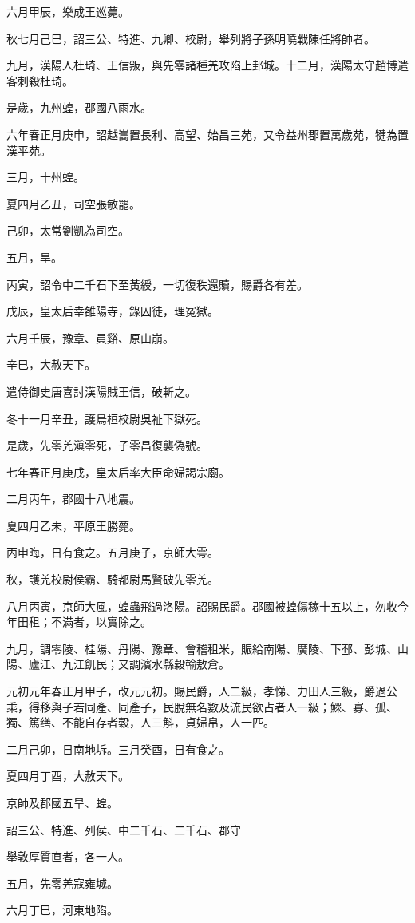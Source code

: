 \begin{pinyinscope}
六月甲辰，樂成王巡薨。

秋七月己巳，詔三公、特進、九卿、校尉，舉列將子孫明曉戰陳任將帥者。

九月，漢陽人杜琦、王信叛，與先零諸種羌攻陷上邽城。十二月，漢陽太守趙博遣客刺殺杜琦。

是歲，九州蝗，郡國八雨水。

六年春正月庚申，詔越巂置長利、高望、始昌三苑，又令益州郡置萬歲苑，犍為置漢平苑。

三月，十州蝗。

夏四月乙丑，司空張敏罷。

己卯，太常劉凱為司空。

五月，旱。

丙寅，詔令中二千石下至黃綬，一切復秩還贖，賜爵各有差。

戊辰，皇太后幸雒陽寺，錄囚徒，理冤獄。

六月壬辰，豫章、員谿、原山崩。

辛巳，大赦天下。

遣侍御史唐喜討漢陽賊王信，破斬之。

冬十一月辛丑，護烏桓校尉吳祉下獄死。

是歲，先零羌滇零死，子零昌復襲偽號。

七年春正月庚戌，皇太后率大臣命婦謁宗廟。

二月丙午，郡國十八地震。

夏四月乙未，平原王勝薨。

丙申晦，日有食之。五月庚子，京師大雩。

秋，護羌校尉侯霸、騎都尉馬賢破先零羌。

八月丙寅，京師大風，蝗蟲飛過洛陽。詔賜民爵。郡國被蝗傷稼十五以上，勿收今年田租；不滿者，以實除之。

九月，調零陵、桂陽、丹陽、豫章、會稽租米，賑給南陽、廣陵、下邳、彭城、山陽、廬江、九江飢民；又調濱水縣穀輸敖倉。

元初元年春正月甲子，改元元初。賜民爵，人二級，孝悌、力田人三級，爵過公乘，得移與子若同產、同產子，民脫無名數及流民欲占者人一級；鰥、寡、孤、獨、篤缮、不能自存者穀，人三斛，貞婦帛，人一匹。

二月己卯，日南地坼。三月癸酉，日有食之。

夏四月丁酉，大赦天下。

京師及郡國五旱、蝗。

詔三公、特進、列侯、中二千石、二千石、郡守

舉敦厚質直者，各一人。

五月，先零羌寇雍城。

六月丁巳，河東地陷。


\end{pinyinscope}
